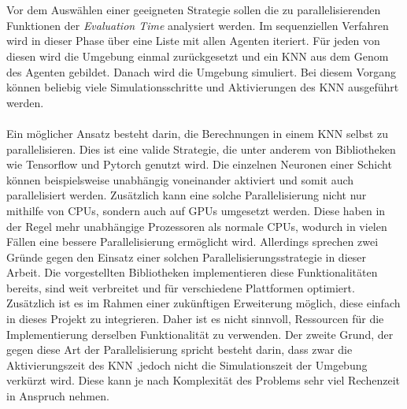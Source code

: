\\\\
Vor dem Auswählen einer geeigneten Strategie sollen die zu parallelisierenden Funktionen der \emph{Evaluation Time} analysiert werden. Im sequenziellen Verfahren wird in dieser Phase über eine Liste mit allen Agenten iteriert. Für jeden von diesen wird die Umgebung einmal zurückgesetzt und ein \ac{KNN} aus dem Genom des Agenten gebildet. Danach wird die Umgebung simuliert. Bei diesem Vorgang können beliebig viele Simulationsschritte und Aktivierungen des \ac{KNN} ausgeführt werden. 
\\\\
Ein möglicher Ansatz besteht darin, die Berechnungen in einem \ac{KNN} selbst zu parallelisieren. Dies ist eine valide Strategie, die unter anderem von Bibliotheken wie Tensorflow und Pytorch genutzt wird. Die einzelnen Neuronen einer Schicht können beispielsweise unabhängig voneinander aktiviert und somit auch parallelisiert werden. Zusätzlich kann eine solche Parallelisierung nicht nur mithilfe von \acp{CPU}, sondern auch auf \acp{GPU} umgesetzt werden. Diese haben in der Regel mehr unabhängige Prozessoren als normale \acp{CPU}, wodurch in vielen Fällen eine bessere Parallelisierung ermöglicht wird. Allerdings sprechen zwei Gründe gegen den Einsatz einer solchen Parallelisierungsstrategie in dieser Arbeit. Die vorgestellten Bibliotheken implementieren diese Funktionalitäten bereits, sind weit verbreitet und für verschiedene Plattformen optimiert. Zusätzlich ist es im Rahmen einer zukünftigen Erweiterung möglich, diese einfach in dieses Projekt zu integrieren. Daher ist es nicht sinnvoll, Ressourcen für die Implementierung derselben Funktionalität zu verwenden. Der zweite Grund, der gegen diese Art der Parallelisierung spricht besteht darin, dass zwar die Aktivierungszeit des \ac{KNN} ,jedoch nicht die Simulationszeit der Umgebung verkürzt wird. Diese kann je nach Komplexität des Problems sehr viel Rechenzeit in Anspruch nehmen. 
\\\\
